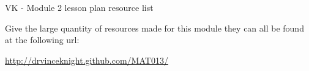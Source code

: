 \documentclass[12pt,a4paper]{article}
\begin{document}
\begin{center}
\Huge{VK - Module 2 lesson plan resource list}
\end{center}

Give the large quantity of resources made for this module they can all be found at the following url:

\begin{center}
    \url{http://drvinceknight.github.com/MAT013/}
\end{center}
\end{document}
